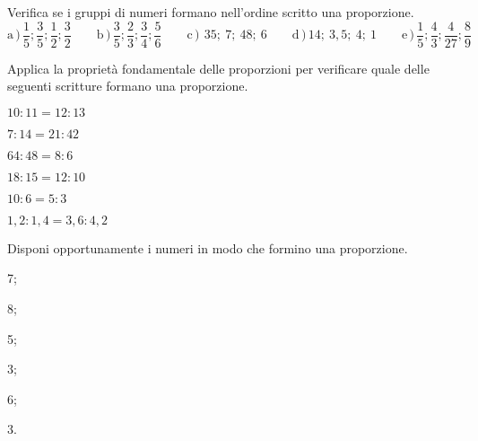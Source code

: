 
\begin{esercizio}
 \label{ese:3.115}
Verifica se i gruppi di numeri formano nell'ordine scritto una proporzione.
\[
\text{a}\,)\,\frac{1}{5}; \frac{3}{5}; \frac{1}{2}; \frac{3}{2}\qquad
\text{b}\,)\,\frac{3}{5}; \frac{2}{3}; \frac{3}{4}; \frac{5}{6}\qquad
\text{c}\,)\,~35;~7;~48;~6\qquad
\text{d}\,)\,14;~3,5;~4;~1\qquad
\text{e}\,)\,\frac{1}{5}; \frac{4}{3}; \frac{4}{27}; \frac{8}{9}
\]
\end{esercizio}

\begin{esercizio}
 \label{ese:3.116}
 Applica la proprietà fondamentale delle proporzioni per verificare quale 
 delle seguenti scritture formano una proporzione.
\begin{multicols}{2}
 \TabPositions{4cm}
 \begin{enumeratea}
 \item \(10:11 =12:13\) \tab\quad\boxSi\quad\boxNo
 \item \(7:14 =21:42\) \tab\quad\boxSi\quad\boxNo
 \item \(64:48 =8:6\) \tab\quad\boxSi\quad\boxNo
 \item \(18:15 =12:10\) \tab\quad\boxSi\quad\boxNo
 \item \(10:6 =5:3\) \tab\quad\boxSi\quad\boxNo
 \item \(1,2:1,4 =3,6:4,2\) \tab\quad\boxSi\quad\boxNo
 \end{enumeratea}
 \end{multicols}
\end{esercizio}

\begin{esercizio}
 \label{ese:3.117}
Disponi opportunamente i numeri in modo che formino una proporzione.
\begin{multicols}{3}
\begin{enumeratea}
\item 7;
\item 8;
\item 5;
\item 3;
\item 6;
\item 3.
\end{enumeratea}
 \end{multicols}
\end{esercizio}

